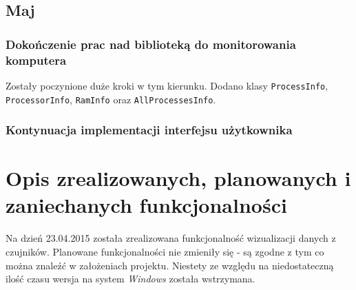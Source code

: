\documentclass[a4paper]{article}
\begin{document}
\subsection{Maj}

\subsubsection{Dokończenie prac nad biblioteką do monitorowania komputera}

Zostały poczynione duże kroki w tym kierunku. Dodano klasy \texttt{ProcessInfo}, \texttt{ProcessorInfo}, \texttt{RamInfo} oraz \texttt{AllProcessesInfo}.

\subsubsection{Kontynuacja implementacji interfejsu użytkownika}


\section{Opis zrealizowanych, planowanych i zaniechanych funkcjonalności}

Na dzień 23.04.2015 została zrealizowana funkcjonalność wizualizacji danych z czujników. Planowane funkcjonalności nie zmieniły się - są zgodne z tym co można znaleźć w założeniach projektu. Niestety ze względu na niedostateczną ilość czasu wersja na system \textit{Windows} została wstrzymana.
\end{document}
